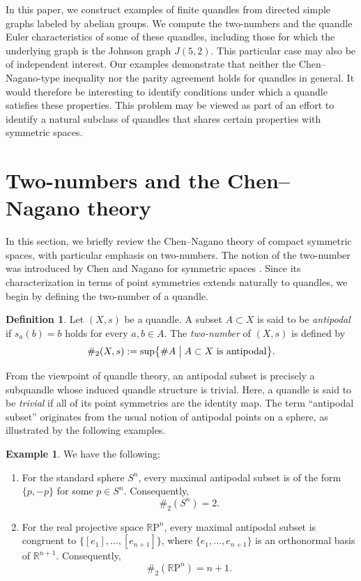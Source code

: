 \documentclass[12pt]{amsart}
\theoremstyle{definition}
\newtheorem{Def}[Prop]{Definition}
\newtheorem{Ex}[Prop]{Example}
\newcommand{\R}{{\mathbb R}}
\newcommand{\RP}{\R \mathrm{P}}
\begin{document}
In this paper,
we construct examples of finite quandles from directed simple graphs labeled by abelian groups. 
We compute the two-numbers and the quandle Euler characteristics of some of these quandles,
including those for which the underlying graph is the Johnson graph $J(5,2)$.
This particular case may also be of independent interest.
Our examples demonstrate that neither the Chen--Nagano-type inequality
nor the parity agreement holds for quandles in general.
It would therefore be interesting to identify conditions under which a quandle satisfies these properties.
This problem may be viewed as part of an effort to identify a natural subclass of quandles
that shares certain properties with symmetric spaces.

\section{Two-numbers and the Chen--Nagano theory}
\label{sec2}

In this section,
we briefly review the Chen--Nagano theory of compact symmetric spaces,
with particular emphasis on two-numbers.
The notion of the two-number was introduced by Chen and Nagano
for symmetric spaces \cite{CN}.
Since its characterization in terms of point symmetries extends naturally to quandles,
we begin by defining the two-number of a quandle.

\begin{Def}
Let $(X,s)$ be a quandle.
A subset $A\subset X$ is said to be \textit{antipodal} if $s_a(b)=b$ holds for every $a,b\in A$. 
The \textit{two-number} of $(X,s)$ is defined by 
\[
\#_2(X,s)
:=
\sup\bigl\{
\#A
\bigm|
A\subset X \text{ is antipodal}
\bigr\}.
\]
\end{Def}

From the viewpoint of quandle theory,
an antipodal subset is precisely a subquandle whose induced quandle structure is trivial.
Here, a quandle is said to be \textit{trivial}
if all of its point symmetries are the identity map.
The term ``antipodal subset'' originates from the usual notion of antipodal points on a sphere,
as illustrated by the following examples.

\begin{Ex}
\label{ex:0822}
We have the following: 
\begin{enumerate}
\item
For the standard sphere $S^n$, 
every maximal antipodal subset is of the form $\{ p , -p \}$ for some $p\in S^n$. 
Consequently, 
\[
\#_2(S^n)=2.
\]
\item
For the real projective space $\RP^n$, every maximal antipodal subset is congruent to 
$\{ [e_1], \ldots , [e_{n+1}] \}$, 
where $\{e_1,\ldots,e_{n+1}\}$ is an orthonormal basis of $\R^{n+1}$. 
Consequently,
\[
\#_2(\RP^n)=n+1.
\]
\end{enumerate}
\end{Ex}
\end{document}
